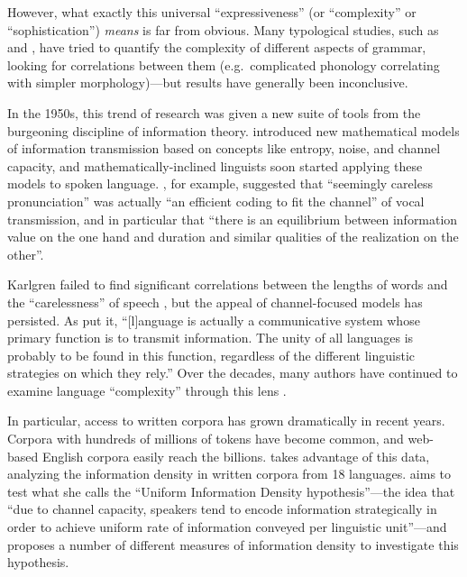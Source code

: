\documentclass[12pt,twoside]{article}
\begin{document}

However, what exactly this universal ``expressiveness'' (or ``complexity'' or ``sophistication'') \emph{means} is far from obvious. Many typological studies, such as \citet{maddieson} and \citet{shosted}, have tried to quantify the complexity of different aspects of grammar, looking for correlations between them (e.g.\ complicated phonology correlating with simpler morphology)---but results have generally been inconclusive.

In the 1950s, this trend of research was given a new suite of tools from the burgeoning discipline of information theory. \citet{shannon} introduced new mathematical models of information transmission based on concepts like entropy, noise, and channel capacity, and mathematically-inclined linguists soon started applying these models to spoken language. \citet[674,676]{karlgren}, for example, suggested that ``seemingly careless pronunciation'' was actually ``an efficient coding to fit the channel'' of vocal transmission, and in particular that ``there is an equilibrium between information value on the one hand and duration and similar qualities of the realization on the other''.

Karlgren failed to find significant correlations between the lengths of words and the ``carelessness'' of speech \citep{karlgren}, but the appeal of channel-focused models has persisted. As \citet[539]{pellegrino} put it, ``[l]anguage is actually a communicative system whose primary function is to transmit information. The unity of all languages is probably to be found in this function, regardless of the different linguistic strategies on which they rely.'' Over the decades, many authors have continued to examine language ``complexity'' through this lens \citep{pellegrino,oh,coupé}.

In particular, access to written corpora has grown dramatically in recent years. Corpora with hundreds of millions of tokens have become common, and web-based English corpora easily reach the billions. \citet{oh} takes advantage of this data, analyzing the information density in written corpora from 18 languages. \citeauthor{oh} aims to test what she calls the ``Uniform Information Density hypothesis''---the idea that ``due to channel capacity, speakers tend to encode information strategically in order to achieve uniform rate of information conveyed per linguistic unit''---and proposes a number of different measures of information density to investigate this hypothesis.
\end{document}
